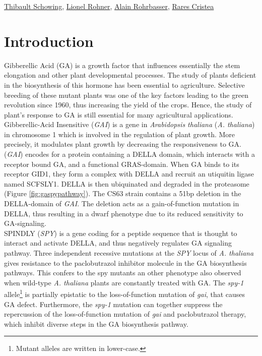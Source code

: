 \documentclass[10pt,a4paper]{article}
\begin{document}
\href{mailto:thibault.schowing@unifr.ch}{Thibault Schowing}, \href{mailto:lio_roh@students.unibe.ch}{Lionel Rohner},
\href{mailto:alain.rohrbasser.unifr.ch}{Alain Rohrbasser},
\href{mailto:rares.cristea@unifr.ch}{Rares Cristea}\\

\section*{\large Introduction}
Gibberellic Acid (GA) is a growth factor that influences essentially the stem elongation and other plant developmental processes\cite{hooley_gibberellins:_nodate}. The study of plants deficient in the biosynthesis of this hormone has been essential to agriculture. Selective breeding of these mutant plants  was one of the key factors leading to the green revolution since 1960, thus increasing the yield of the crops. Hence, the study of plant’s response to GA is still essential for many agricultural applications\cite{ordonio_new_2017}. Gibberellic-Acid Insensitive (\textit{GAI}) is a gene in \textit{Arabidopsis thaliana} (\textit{A. thaliana}) in chromosome 1 which is involved in the regulation of plant growth. More precisely, it modulates plant growth by decreasing the responsiveness to GA\cite{peng_arabidopsis_1997}. (\textit{GAI}) encodes for a protein containing a DELLA domain, which interacts with a receptor bound GA, and a functional GRAS-domain. When GA binds to its receptor GID1, they form a complex with DELLA and recruit an utiquitin ligase named SCFSLY1. DELLA is then ubiquinated and degraded in the proteasome (Figure \ref{fig:gaspypathway})\cite{hauvermale_gibberellin_2012}. The CS63 strain contains a 51bp deletion in the DELLA-domain of \textit{GAI}. The deletion acts as a gain-of-function mutation in DELLA, thus resulting in a dwarf phenotype due to its reduced sensitivity to GA-signaling\cite{peng_arabidopsis_1997,lee_gibberellin_2002}.\\


\noindent SPINDLY (\textit{SPY}) is a gene coding for a peptide sequence that is thought to interact and activate DELLA, and thus negatively regulates GA signaling pathway\cite{zentella_arabidopsis_2017}. Three independent recessive mutations at the \textit{SPY} locus of \textit{A. thaliana} gives resistance to the paclobutrazol inhibitor molecule in the GA biosynthesis pathways. This confers to the spy mutants an other phenotype also observed when wild-type \textit{A. thaliana} plants are constantly treated with GA. The \textit{spy-1} allele\footnote{Mutant alleles are written in lower-case.} is partially epistatic to the loss-of-function mutation of \textit{gai}, that causes GA defect. Furthermore, the \textit{spy-1} mutation can together suppress the repercussion of the loss-of-function mutation of \textit{gai} and paclobutrazol therapy, which inhibit diverse steps in the GA biosynthesis pathway\cite{lee_gibberellin_2002, jacobsen_mutations_nodate}.\\
\end{document}
